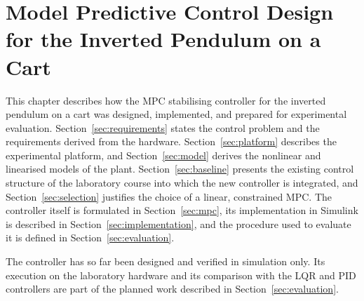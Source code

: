 
\providecommand{\placeholderfig}[5]{
    \begin{figure}[ht]
     \centering
      \fbox{\parbox[c][0.28\textheight][c]{#1\textwidth}{\centering
        \textbf{Figure placeholder}\\[2mm]
        \texttt{\detokenize{images/#2}}\\[2mm]
        \small #5}}
      \caption{#3}
      \label{#4}
    \end{figure}
}

\chapter{Model Predictive Control Design for the Inverted Pendulum on a Cart}
\label{chap:methodology}

This chapter describes how the \ac{MPC} stabilising
controller for the inverted pendulum on a cart was designed, implemented, and
prepared for experimental evaluation. Section~\ref{sec:requirements} states the
control problem and the requirements derived from the hardware.
Section~\ref{sec:platform} describes the experimental platform, and
Section~\ref{sec:model} derives the nonlinear and linearised models of the
plant. Section~\ref{sec:baseline} presents the existing control structure of
the laboratory course into which the new controller is integrated, and
Section~\ref{sec:selection} justifies the choice of a linear, constrained
\ac{MPC}. The controller itself is formulated in Section~\ref{sec:mpc}, its
implementation in Simulink is described in Section~\ref{sec:implementation},
and the procedure used to evaluate it is defined in
Section~\ref{sec:evaluation}.

The controller has so far been designed and verified in simulation only. Its
execution on the laboratory hardware and its comparison with the \ac{LQR} and \ac{PID} controllers are part of the planned work described in
Section~\ref{sec:evaluation}.

